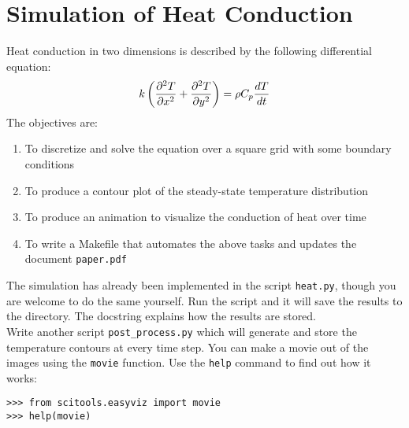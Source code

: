 \documentclass{article}
\begin{document}
\section*{Simulation of Heat Conduction}
Heat conduction in two dimensions is described by the following differential equation:
\begin{equation}
k\left(\frac{\partial^{2} T}{\partial x^{2}} + 
\frac{\partial^{2} T}{\partial y^{2}}\right)
 = \rho C_{p} \frac{dT}{dt}
\newline
\end{equation}
The objectives are:
\begin{enumerate}
\item{To discretize and solve the equation over a square grid with some 
		boundary conditions}
\item{To produce a contour plot of the steady-state temperature distribution}
\item{To produce an animation to visualize the conduction of heat
		over time}
\item{To write a Makefile that automates the above tasks and updates the document
		\texttt{paper.pdf}}
\end{enumerate}
The simulation has already been implemented in the script \texttt{heat.py}, 
though you are welcome to do the same yourself. Run the script and it 
will save the results to the directory. The docstring explains how the results 
are stored. \newline \\
Write another script \texttt{post\_process.py} which will generate
and store the temperature contours at every time step. You can make a movie out
of the images using the \texttt{movie} function. Use the \texttt{help}
command to find out how it works:

\begin{verbatim}
>>> from scitools.easyviz import movie
>>> help(movie)
\end{verbatim}
\end{document}
